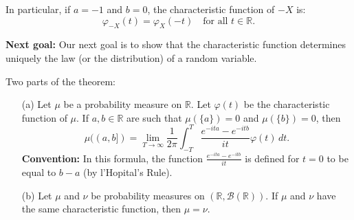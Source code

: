 In particular, if \( a = -1 \) and \( b = 0 \), the characteristic function of \( -X \) is:
\[
\varphi_{-X}(t) = \varphi_X(-t) \quad \text{for all } t \in \mathbb{R}.
\]

\textbf{Next goal:} Our next goal is to show that the characteristic function determines uniquely the law (or the distribution) of a random variable.


\begin{theorem}[Theorem 26.2.]
Two parts of the theorem:
\begin{enumerate}
    \item[(a)] Let \(\mu\) be a probability measure on \(\mathbb{R}\). Let \(\varphi(t)\) be the characteristic function of \(\mu\). If \(a, b \in \mathbb{R}\) are such that \(\mu(\{a\}) = 0\) and \(\mu(\{b\}) = 0\), then
    \[
    \mu((a,b]) = \lim_{T \to \infty} \frac{1}{2\pi} \int_{-T}^{T} \frac{e^{-ita} - e^{-itb}}{it} \varphi(t) \, dt.
    \]
    \textbf{Convention:} In this formula, the function \(\frac{e^{-ita} - e^{-itb}}{it}\) is defined for \(t = 0\) to be equal to \(b-a\) (by l'Hopital's Rule).

    \item[(b)] Let \(\mu\) and \(\nu\) be probability measures on \((\mathbb{R}, \mathcal{B}(\mathbb{R}))\). If \(\mu\) and \(\nu\) have the same characteristic function, then \(\mu = \nu\).
\end{enumerate}
\end{theorem}

